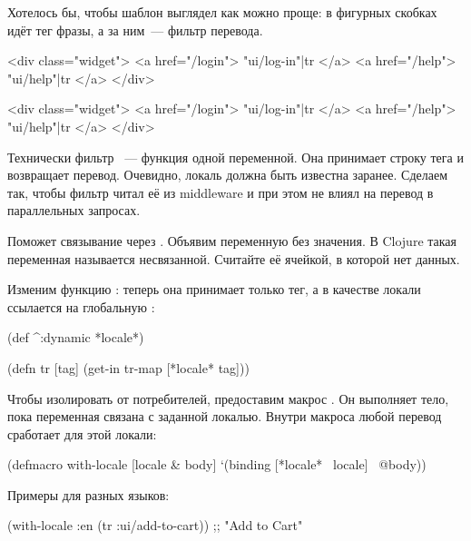 \fi

Хотелось бы, чтобы шаблон выглядел как можно проще: в фигурных скобках идёт тег
фразы, а за ним~--- фильтр перевода.

\ifnarrow

\begin{htmldjango}
<div class="widget">
  <a href="/login">
    {{ "ui/log-in"|tr }}
  </a>
  <a href="/help">
    {{ "ui/help"|tr }}
  </a>
</div>
\end{htmldjango}

\else

\begin{htmldjango}
<div class="widget">
  <a href="/login">{{ "ui/log-in"|tr }}</a>
  <a href="/help">{{ "ui/help"|tr }}</a>
</div>
\end{htmldjango}

\fi

Технически фильтр ~--- функция одной переменной. Она принимает строку
тега и возвращает перевод. Очевидно, локаль должна быть известна
заранее. Сделаем так, чтобы фильтр читал её из middleware и при этом не влиял на
перевод в параллельных запросах.

Поможет связывание через . Объявим переменную  без
значения. В Clojure такая переменная называется несвязанной. Считайте её
ячейкой, в которой нет данных.

Изменим функцию : теперь она принимает только тег, а в качестве
локали ссылается на глобальную :

\pagebreakafive

\begin{clojure}
(def ^:dynamic *locale*)

(defn tr [tag]
  (get-in tr-map [*locale* tag]))
\end{clojure}


Чтобы изолировать  от потребителей, предоставим макрос
. Он выполняет тело, пока переменная связана с заданной
локалью. Внутри макроса любой перевод сработает для этой локали:

\begin{clojure}
(defmacro with-locale
  [locale & body]
  `(binding [*locale* ~locale]
     ~@body))
\end{clojure}

Примеры для разных языков:

\ifnarrow

\begin{clojure}
(with-locale :en
  (tr :ui/add-to-cart))
;; "Add to Cart"
\end{clojure}

